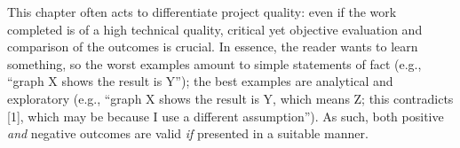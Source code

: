 \noindent
This chapter often acts to differentiate project quality: even if the work
completed is of a high technical quality, critical yet objective evaluation 
and comparison of the outcomes is crucial.  In essence, the reader wants to
learn something, so the worst examples amount to simple statements of fact 
(e.g., ``graph X shows the result is Y''); the best examples are analytical 
and exploratory (e.g., ``graph X shows the result is Y, which means Z; this 
contradicts [1], which may be because I use a different assumption'').  As 
such, both positive {\em and} negative outcomes are valid {\em if} presented 
in a suitable manner.

